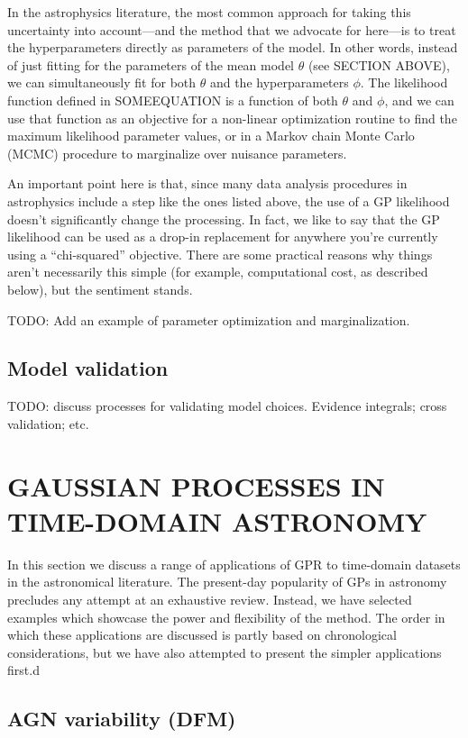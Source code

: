 \documentclass[letterpaper]{ar-1col}
\begin{document}
In the astrophysics literature, the most common approach for taking this uncertainty into account---and the method that we advocate for here---is to treat the hyperparameters directly as parameters of the model.
In other words, instead of just fitting for the parameters of the mean model $\theta$ (see SECTION ABOVE), we can simultaneously fit for both $\theta$ and the hyperparameters $\phi$.
The likelihood function defined in SOMEEQUATION is a function of both $\theta$ and $\phi$, and we can use that function as an objective for a non-linear optimization routine to find the maximum likelihood parameter values, or in a Markov chain Monte Carlo (MCMC) procedure to marginalize over nuisance parameters.

An important point here is that, since many data analysis procedures in astrophysics include a step like the ones listed above, the use of a GP likelihood doesn't significantly change the processing.
In fact, we like to say that the GP likelihood can be used as a drop-in replacement for anywhere you're currently using a ``chi-squared'' objective.
There are some practical reasons why things aren't necessarily this simple (for example, computational cost, as described below), but the sentiment stands.

TODO: Add an example of parameter optimization and marginalization.

\subsection{Model validation}

TODO: discuss processes for validating model choices. Evidence integrals; cross validation; etc.


\section{GAUSSIAN PROCESSES IN TIME-DOMAIN ASTRONOMY}
\label{sec:uses}

In this section we discuss a range of applications of GPR to time-domain datasets in the astronomical literature. The present-day popularity of GPs in astronomy precludes any attempt at an exhaustive review. Instead, we have selected examples which showcase the power and flexibility of the method. The order in which these applications are discussed is partly based on chronological considerations, but we have also attempted to present the simpler applications first.d

\subsection{AGN variability (DFM)}
\end{document}
